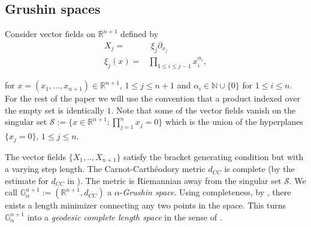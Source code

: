 \documentclass[12pt]{amsart}
\numberwithin{equation}{section}
\theoremstyle{plain}
\theoremstyle{definition}
\theoremstyle{remark}
\begin{document}
\subsection{Grushin spaces}
Consider vector fields on $\mathbb{R}^{n+1}$ defined by
\begin{equation}
    \label{Grushin vector fields}
    \begin{split}
        X_j=      & \,\,\xi_j\partial_{x_j}                          \\
        \xi_j(x)= & \prod_{1\leqslant i\leqslant j-1}x_i^{\alpha_i},
    \end{split}
\end{equation}

for $x = (x_1, \dots, x_{n + 1})\in \mathbb{R}^{n+1}$, $1\leqslant j\leqslant n+1$ and $\alpha_i\in \mathbb{N}\cup\{0\}$ for $1\leqslant i\leqslant n$. For the rest of the paper we will use the convention that a product indexed over the empty set is identically $1$. Note that some of the vector fields vanish on the singular set $\mathcal{S}:=\{x\in \mathbb{R}^{n+1}: \prod_{j=1}^n x_j=0\}$ which is the union of the hyperplanes $\{x_j=0\}$, $1\leq j\leq n$.

The vector fields $\{X_1,..,X_{n+1}\}$ satisfy the bracket generating condition but with a varying step length. The Carnot-Carth\'{e}odory metric $d_{CC}$ is complete (by the estimate for $d_{CC}$ in \cite[Theorem 3.1]{WuJang-Mei2015}). The metric is Riemannian away from the singular set $\mathcal{S}$.
We call $\mathbb{G}^{n+1}_\alpha:=(\mathbb{R}^{n+1}, d_{CC})$ a $\alpha$-\emph{Grushin space}. Using completeness, by \cite[Theorem 3.43]{AgrachevBarilariBoscainBook2020}, there exists a length minimizer connecting any two points in the space. This turns $\mathbb{G}^{n+1}_\alpha$ into a \emph{geodesic complete length space} in the sense of \cite{BuragoBuragoIvanovBookEng}.
\end{document}
